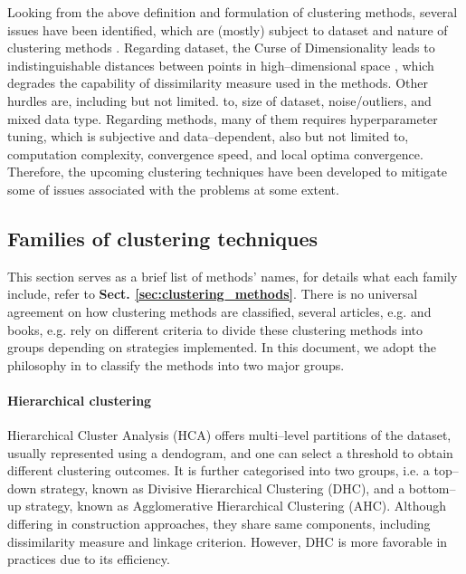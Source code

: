 Looking from the above definition and formulation of clustering methods, several issues have been identified, which are (mostly) subject to dataset and nature of clustering methods \cite{ref_1}.
Regarding dataset, the Curse of Dimensionality leads to indistinguishable distances between points in high–dimensional space \cite{ref_9}, which degrades the capability of dissimilarity measure used in the methods.
Other hurdles are, including but not limited. to, size of dataset, noise/outliers, and mixed data type.
Regarding methods, many of them requires hyperparameter tuning, which is subjective and data–dependent, also but not limited to, computation complexity, convergence speed, and local optima convergence.
Therefore, the upcoming clustering techniques have been developed to mitigate some of issues associated with the problems at some extent.

\subsection{Families of clustering techniques}
\label{sec:background:families}

This section serves as a brief list of methods' names, for details what each family include, refer to \textbf{Sect. \ref{sec:clustering_methods}}.
There is no universal agreement on how clustering methods are classified, several articles, e.g. \cite{ref_4, ref_2, ref_6} and books, e.g. \cite{ref_10, ref_11} rely on different criteria to divide these clustering methods into groups depending on strategies implemented.
In this document, we adopt the philosophy in \cite{ref_1} to classify the methods into two major groups.

\paragraph{Hierarchical clustering} Hierarchical Cluster Analysis (HCA) offers multi–level partitions of the dataset, usually represented using a dendogram, and one can select a threshold to obtain different clustering outcomes.
It is further categorised into two groups, i.e. a top–down strategy, known as Divisive Hierarchical Clustering (DHC), and a bottom–up strategy, known as Agglomerative Hierarchical Clustering (AHC). Although differing in construction approaches, they share same components, including dissimilarity measure and linkage criterion.
However, DHC is more favorable in practices due to its efficiency.

